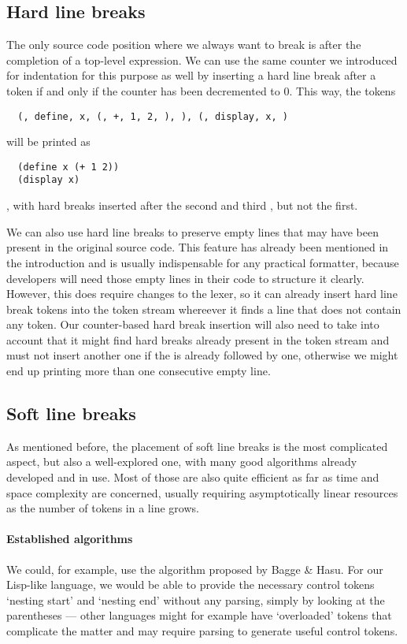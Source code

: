 \subsection{Hard line breaks}
The only source code position where we always want to break
is after the completion of a top-level expression.
We can use the same counter we introduced for indentation for this purpose as well
by inserting a hard line break after a  token if and only if
the counter has been decremented to 0.
This way, the tokens
\begin{verbatim}
  (, define, x, (, +, 1, 2, ), ), (, display, x, )
\end{verbatim}
will be printed as
\begin{verbatim}
  (define x (+ 1 2))
  (display x)
\end{verbatim}
, with hard breaks inserted after the second and third , but not the first.

We can also use hard line breaks to preserve empty lines
that may have been present in the original source code.
This feature has already been mentioned in the introduction and
is usually indispensable for any practical formatter,
because developers will need those empty lines in their code to structure it clearly.
However, this does require changes to the lexer,
so it can already insert hard line break tokens into the token stream
whereever it finds a line that does not contain any token.
Our counter-based hard break insertion will also need to take into account
that it might find hard breaks already present in the token stream
and must not insert another one if the  is already followed by one,
otherwise we might end up printing more than one consecutive empty line.

\subsection{Soft line breaks}
As mentioned before, the placement of soft line breaks is the most complicated aspect,
but also a well-explored one, with many good algorithms already developed and in use.
Most of those are also quite efficient as far as time and space complexity are concerned,
usually requiring asymptotically linear resources as the number of tokens in a line grows.

\paragraph{Established algorithms}
We could, for example, use the algorithm proposed by Bagge \& Hasu.
\autocite[Chapter: Line Breaking]{prettyGoodFormattingPipeline}
For our Lisp-like language, we would be able to provide the necessary control tokens
`nesting start' and `nesting end' without any parsing, simply by looking at the parentheses
--- other languages might for example have `overloaded' tokens that complicate the matter
and may require parsing to generate useful control tokens.

